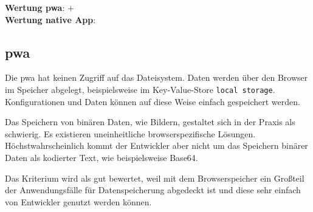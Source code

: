 \textbf{Wertung \ac{pwa}}: $+$\\
\textbf{Wertung native App}:  \\

\subsection{\ac{pwa}}
Die \ac{pwa} hat keinen Zugriff auf das Dateisystem. Daten werden über den Browser im Speicher abgelegt, beispielsweise im Key-Value-Store \texttt{local storage}. Konfigurationen und Daten können auf diese Weise einfach gespeichert werden.

Das Speichern von binären Daten, wie Bildern, gestaltet sich in der Praxis als schwierig. Es existieren uneinheitliche browserspezifische Lösungen. Höchstwahrscheinlich kommt der Entwickler aber nicht um das Speichern binärer Daten als kodierter Text, wie beispielsweise Base64.

Das Kriterium wird als gut bewertet, weil mit dem Browserspeicher ein Großteil der Anwendungsfälle für Datenspeicherung abgedeckt ist und diese sehr einfach von Entwickler genutzt werden können.
